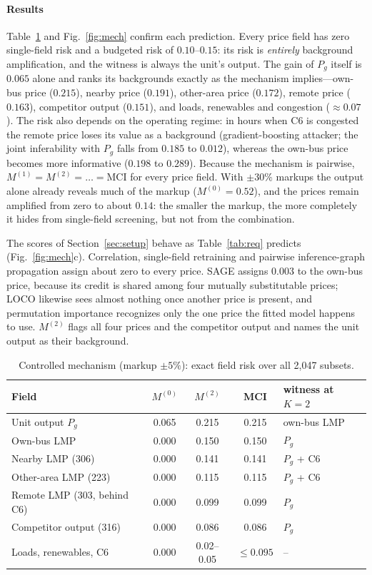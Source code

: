 \paragraph{Results}
Table~\ref{tab:mech} and Fig.~\ref{fig:mech} confirm each prediction. Every price field has zero
single-field risk and a budgeted risk of $0.10$--$0.15$: its risk is \emph{entirely} background
amplification, and the witness is always the unit's output. The gain of $P_g$ itself is $0.065$ alone
and ranks its backgrounds exactly as the mechanism implies---own-bus price ($0.215$), nearby price
($0.191$), other-area price ($0.172$), remote price ($0.163$), competitor output ($0.151$), and
loads, renewables and congestion ($\approx0.07$). The risk also depends on the operating regime: in
hours when C6 is congested the remote price loses its value as a background (gradient-boosting attacker; the joint inferability
with $P_g$ falls from $0.185$ to $0.012$), whereas the own-bus price becomes more informative ($0.198$ to
$0.289$). Because the mechanism is pairwise, $M^{(1)}=M^{(2)}=\dots=\mathrm{MCI}$ for every price field.
With $\pm30\%$ markups the output alone already reveals much of the markup ($M^{(0)}=0.52$), and the
prices remain amplified from zero to about $0.14$: the smaller the markup, the more completely it
hides from single-field screening, but not from the combination.

The scores of Section~\ref{sec:setup} behave as Table~\ref{tab:req} predicts (Fig.~\ref{fig:mech}c).
Correlation, single-field retraining and pairwise inference-graph propagation assign about zero to
every price. SAGE assigns $0.003$ to the own-bus price, because its credit is shared among four
mutually substitutable prices; LOCO likewise sees almost nothing once another price is present, and
permutation importance recognizes only the one price the fitted model happens to use. $M^{(2)}$ flags
all four prices and the competitor output and names the unit output as their background.

\begin{table}[!tbp]
\centering\small
\caption{Controlled mechanism (markup $\pm5\%$): exact field risk over all 2,047 subsets.}\label{tab:mech}
\begin{tabular}{lcccl}
\toprule
Field & $M^{(0)}$ & $M^{(2)}$ & MCI & witness at $K=2$ \\
\midrule
Unit output $P_g$ & 0.065 & 0.215 & 0.215 & own-bus LMP \\
Own-bus LMP & 0.000 & 0.150 & 0.150 & $P_g$ \\
Nearby LMP (306) & 0.000 & 0.141 & 0.141 & $P_g$ + C6 \\
Other-area LMP (223) & 0.000 & 0.115 & 0.115 & $P_g$ + C6 \\
Remote LMP (303, behind C6) & 0.000 & 0.099 & 0.099 & $P_g$ \\
Competitor output (316) & 0.000 & 0.086 & 0.086 & $P_g$ \\
Loads, renewables, C6 & 0.000 & 0.02--0.05 & $\le0.095$ & -- \\
\bottomrule
\end{tabular}
\end{table}

